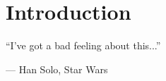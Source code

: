 \chapter{Introduction}
\label{ch:introduction}

\epigraph{``I've got a bad feeling about this...''}{--- \textup{Han Solo}, Star Wars}





